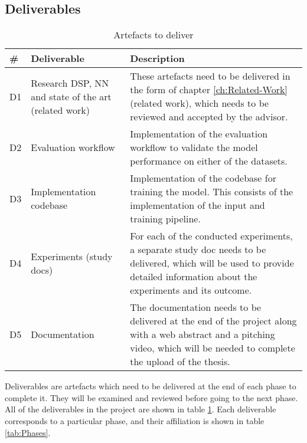 \subsection{Deliverables}
\label{sec:Deliverables-Project}
\begin{table}[htb]
    \centering
    \caption{Artefacts to deliver}
	\label{tab:Deliverables}
    \begin{tabular}{p{} | p{} | p{}}
        \toprule
        \textbf{\#} & \textbf{Deliverable} & \textbf{Description} \\ 
        \midrule[1pt]
        D1 & Research \gls{DSP}, \gls{NN} and state of the art (related work) & These artefacts need to be delivered in the form of chapter \ref{ch:Related-Work} (related work), which needs to be reviewed and accepted by the advisor. \\
        \hline
        D2 & Evaluation workflow &  Implementation of the evaluation workflow to validate the model performance on either of the datasets. \\
        \hline
        D3 & Implementation codebase & Implementation of the codebase for training the model. This consists of the implementation of the input and training pipeline. \\
        \hline
        D4 & Experiments (study docs) &  For each of the conducted experiments, a separate study doc needs to be delivered, which will be used to provide detailed information about the experiments and its outcome. \\
        \hline
        D5 & Documentation & The documentation needs to be delivered at the end of the project along with a web abstract and a pitching video, which will be needed to complete the upload of the thesis. \\
        \bottomrule
    \end{tabular}
\end{table}
\noindent
Deliverables are artefacts which need to be delivered at the end of each phase to complete it. They will be examined and reviewed before going to the next phase. All of the deliverables in the project are shown in table \ref{tab:Deliverables}. Each deliverable corresponds to a particular phase, and their affiliation is shown in table \ref{tab:Phases}.

